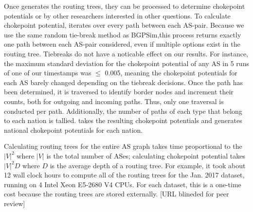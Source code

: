 \par Once \toolname{} generates the routing trees, they can be processed to
determine chokepoint potentials or by other researchers interested in other questions. To calculate chokepoint potential, \toolname{} iterates over every path
between each AS-pair. Because we use the same random tie-break method as BGPSim,this process returns 
exactly one path between each AS-pair considered, even if multiple options exist in the
routing tree. Tiebreaks do not have a noticable effect on our results. For instance, the maximum
standard deviation for the chokepoint potential of any AS in 5 runs of one of our timestamps was 
$\leq$ 0.005, meaning the chokepoint potentials for each AS barely changed depending on the tiebreak
decisions.
Once the path has been determined, it is traversed to identify border nodes and increment their counts, both
for outgoing and incoming paths.  Thus, only one traversal is conducted
per path. Additionally, the number of paths of each type that belong to each
nation is tallied. \toolname{} takes the resulting chokepoint
potentials and generates national chokepoint potentials for each nation.

Calculating routing trees for the entire AS graph takes time proportional to the $|V|^2$ where $|V|$ is the total number of ASes; calculating chokepoint potential takes $|V|^2D$ where $D$ is the average depth of a routing tree. For example,
it took about 12 wall clock hours to compute all of the routing trees for the Jan. 2017 dataset, running on 4 Intel Xeon E5-2680 V4 CPUs.  For each dataset, this is a one-time cost because the routing trees are stored externally.  [URL blineded for peer review] 
